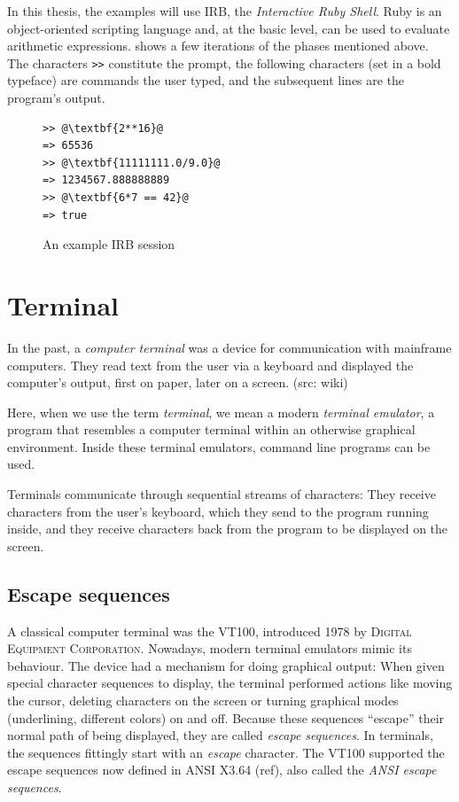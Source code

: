 \documentclass[paper=a4,twoside,abstract=on,cleardoublepage=empty,numbers=noenddot,toc=bib,11pt,appendixprefix=true]{scrreprt}
\begin{document}
In this thesis, the examples will use IRB, the \emph{Interactive Ruby Shell}. Ruby is an object-oriented scripting language and, at the basic level, can be used to evaluate arithmetic expressions.  shows a few iterations of the phases mentioned above. The characters \texttt{>\->} constitute the prompt, the following characters (set in a bold typeface) are commands the user typed, and the subsequent lines are the program's output.

\begin{figure}[tb]
    \begin{lstlisting}[escapechar=@]
>> @\textbf{2**16}@
=> 65536
>> @\textbf{11111111.0/9.0}@
=> 1234567.888888889
>> @\textbf{6*7 == 42}@
=> true
    \end{lstlisting}
    \centering
    \caption{An example IRB session}
    \label{fig:irb}
\end{figure}

\section{Terminal}

In the past, a \emph{computer terminal} was a device for communication with mainframe computers. They read text from the user via a keyboard and displayed the computer's output, first on paper, later on a screen. (src: wiki)

Here, when we use the term \emph{terminal}, we mean a modern \emph{terminal emulator}, a program that resembles a computer terminal within an otherwise graphical environment. Inside these terminal emulators, command line programs can be used.

Terminals communicate through sequential streams of characters: They receive characters from the user's keyboard, which they send to the program running inside, and they receive characters back from the program to be displayed on the screen.

\subsection{Escape sequences}

A classical computer terminal was the \textsc{VT100}, introduced 1978 by \textsc{Digital Equipment Corporation}. Nowadays, modern terminal emulators mimic its behaviour. The device had a mechanism for doing graphical output: When given special character sequences to display, the terminal performed actions like moving the cursor, deleting characters on the screen or turning graphical modes (underlining, different colors) on and off. Because these sequences “escape” their normal path of being displayed, they are called \emph{escape sequences}. In terminals, the sequences fittingly start with an \emph{escape} character. The \textsc{VT100} supported the escape sequences now defined in ANSI X3.64 (ref), also called the \emph{ANSI escape sequences}.
\end{document}
